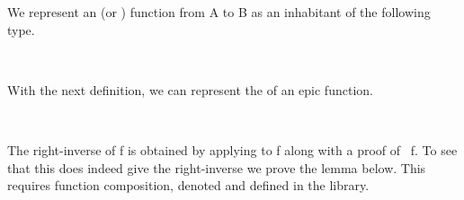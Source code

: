 We represent an  (or ) function from \ab A to \ab B \as as an inhabitant of the following type.
\ccpad
\begin{code}%
\>[1]\AgdaSpace{}%
\AgdaSymbol{:}\AgdaSpace{}%
\AgdaSymbol{(}\AgdaSpace{}%
\AgdaSpace{}%
\AgdaSymbol{)}\AgdaSpace{}%
%
\>[23]\AgdaSpace{}%
\AgdaSpace{}%
\AgdaSpace{}%
\<%
\\
%
\>[1]\AgdaSpace{}%
\AgdaSpace{}%
\AgdaSymbol{=}\AgdaSpace{}%
\AgdaSpace{}%
\AgdaSpace{}%
\AgdaSpace{}%
\AgdaSpace{}%
\AgdaSpace{}%
\AgdaSpace{}%
\<%
\end{code}
\ccpad
With the next definition, we can represent the  of an epic function.
\ccpad
\begin{code}%
\>[1]\AgdaSpace{}%
\AgdaSymbol{:}\AgdaSpace{}%
\AgdaSymbol{(}\AgdaSpace{}%
\AgdaSymbol{:}\AgdaSpace{}%
\AgdaSpace{}%
\AgdaSpace{}%
\AgdaSymbol{)}\AgdaSpace{}%
\AgdaSpace{}%
\AgdaSpace{}%
\AgdaSpace{}%
\AgdaSpace{}%
\AgdaSpace{}%
\AgdaSpace{}%
\<%
\\
%
\>[1]\AgdaSpace{}%
\AgdaSpace{}%
\AgdaSpace{}%
\AgdaSpace{}%
\AgdaSymbol{=}\AgdaSpace{}%
\AgdaSpace{}%
\AgdaSpace{}%
\AgdaSymbol{(}\AgdaSpace{}%
\AgdaSymbol{)}\<%
\end{code}
\ccpad
The right-inverse of \ab f is obtained by applying  to \ab f along with a proof of ~\ab f. To see that this does indeed give the right-inverse we prove the  lemma below. This requires function composition, denoted  and defined in the \typetopology library.
\ccpad
